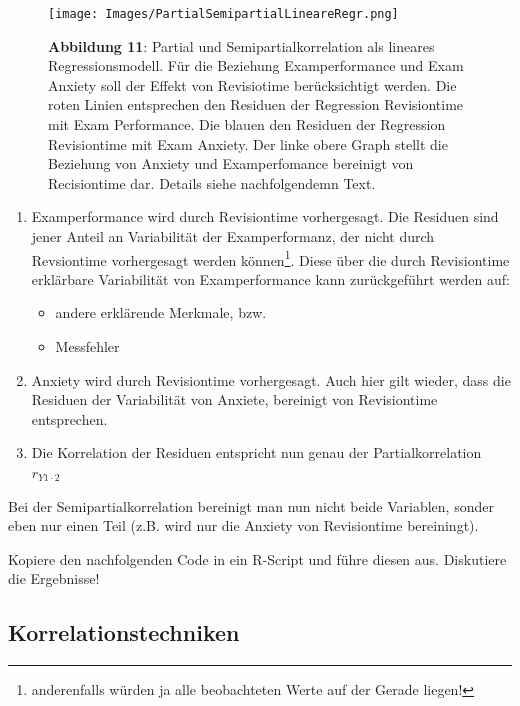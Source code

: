 \documentclass[]{article}
\providecommand{\tightlist}{%
  \setlength{\itemsep}{0pt}\setlength{\parskip}{0pt}}
\let\rmarkdownfootnote\footnote%
\def\footnote{\protect\rmarkdownfootnote}
\begin{document}
\begin{figure}
\centering
\texttt{[image: Images/PartialSemipartialLineareRegr.png]}
\caption{\textbf{Abbildung 11}: Partial und Semipartialkorrelation als lineares Regressionsmodell. Für die Beziehung Examperformance und Exam Anxiety soll der Effekt von Revisiotime berücksichtigt werden. Die roten Linien entsprechen den Residuen der Regression Revisiontime mit Exam Performance. Die blauen den Residuen der Regression Revisiontime mit Exam Anxiety. Der linke obere Graph stellt die Beziehung von Anxiety und Examperfomance bereinigt von Recisiontime dar. Details siehe nachfolgendemn Text.}
\end{figure}

\begin{enumerate}
\def\labelenumi{\arabic{enumi}.}
\tightlist
\item
  Examperformance wird durch Revisiontime vorhergesagt. Die Residuen sind jener Anteil an Variabilität der Examperformanz, der nicht durch Revsiontime vorhergesagt werden können\footnote{anderenfalls würden ja alle beobachteten Werte auf der Gerade liegen!}. Diese über die durch Revisiontime erklärbare Variabilität von Examperformance kann zurückgeführt werden auf:

  \begin{itemize}
  \tightlist
  \item
    andere erklärende Merkmale, bzw.
  \item
    Messfehler
  \end{itemize}
\item
  Anxiety wird durch Revisiontime vorhergesagt. Auch hier gilt wieder, dass die Residuen der Variabilität von Anxiete, bereinigt von Revisiontime entsprechen.
\item
  Die Korrelation der Residuen entspricht nun genau der Partialkorrelation \(r_{Y1\cdot2}\)
\end{enumerate}

Bei der Semipartialkorrelation bereinigt man nun nicht beide Variablen, sonder eben nur einen Teil (z.B. wird nur die Anxiety von Revisiontime bereiningt).

Kopiere den nachfolgenden Code in ein R-Script und führe diesen aus. Diskutiere die Ergebnisse!

\hypertarget{korrelationstechniken}{%
\subsection*{Korrelationstechniken}\label{korrelationstechniken}}
\end{document}
